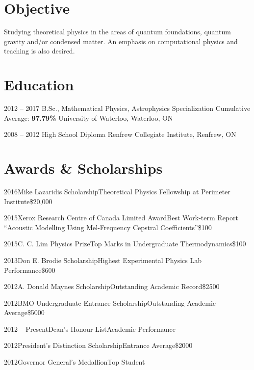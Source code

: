 \documentclass{article}
\begin{document}

    \section{Objective}
    Studying theoretical physics in the areas of quantum foundations, quantum gravity and/or condensed matter. An emphasis on computational physics and teaching is also desired.
    \section{Education}
    \begin{educationlist}
        \item{2012 -- 2017}
             {B.Sc., Mathematical Physics, Astrophysics Specialization}
             {Cumulative Average: \textbf{97.79\%}}
             {University of Waterloo, Waterloo, ON}
        \item{2008 -- 2012}
             {High School Diploma}
             {}
             {Renfrew Collegiate Institute, Renfrew, ON}
    \end{educationlist}
    \section{Awards \& Scholarships}
    \begin{awardlist}
        \item{2016}{Mike Lazaridis Scholarship}{Theoretical Physics Fellowship at Perimeter Institute}{\$20,000}
        \item{2015}{Xerox Research Centre of Canada Limited Award}{Best Work-term Report ``Acoustic Modelling Using Mel-Frequency Cepstral Coefficients''}{\$100}
        \item{2015}{C. C. Lim Physics Prize}{Top Marks in Undergraduate Thermodynamics}{\$100}
        \item{2013}{Don E. Brodie Scholarship}{Highest Experimental Physics Lab Performance}{\$600}
        \item{2012}{A. Donald Maynes Scholarship}{Outstanding Academic Record}{\$2500}
        \item{2012}{BMO Undergraduate Entrance Scholarship}{Outstanding Academic Average}{\$5000}
        \item{2012 -- Present}{Dean's Honour List}{Academic Performance}{}
        \item{2012}{President's Distinction Scholarship}{Entrance Average}{\$2000}
        \item{2012}{Governor General's Medallion}{Top Student}{}
    \end{awardlist}
\end{document}

